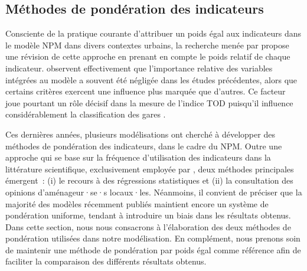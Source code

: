 \begin{refsegment}
\subsection{Méthodes de pondération des indicateurs
    \label{chap6:methodologie-ponderation-indicateurs}
    }

Consciente de la pratique courante d'attribuer un poids égal aux indicateurs dans le modèle \acrshort{NPM} dans divers contextes urbains, la recherche menée par \textcolor{blue}{\textcite[9]{liao_evaluating_2022}} propose une révision de cette approche en prenant en compte le poids relatif de chaque indicateur. \textcolor{blue}{\textcite[15]{monajem_evaluation_2015}} observent effectivement que l'importance relative des variables intégrées au modèle a souvent été négligée dans les études précédentes, alors que certains critères exercent une influence plus marquée que d'autres. Ce facteur joue pourtant un rôle décisif dans la mesure de l'indice \acrshort{TOD} puisqu'il influence considérablement la classification des gares \textcolor{blue}{\autocite[10]{lukman_development_2014}}.%

Ces dernières années, plusieurs modélisations ont cherché à développer des méthodes de pondération des indicateurs, dans le cadre du \acrshort{NPM}. Outre une approche qui se base sur la fréquence d'utilisation des indicateurs dans la littérature scientifique, exclusivement employée par \textcolor{blue}{\textcite[42]{lyu_developing_2016}}, deux méthodes principales émergent~: (i) le recours à des régressions statistiques et (ii) la consultation des opinions d'aménageur·se·s locaux·les. Néanmoins, il convient de préciser que la majorité des modèles récemment publiés maintient encore un système de pondération uniforme, tendant à introduire un biais dans les résultats obtenus. Dans cette section, nous nous consacrons à l'élaboration des deux méthodes de pondération utilisées dans notre modélisation. En complément, nous prenons soin de maintenir une méthode de pondération par poids égal comme référence afin de faciliter la comparaison des différents résultats obtenus.%


\end{refsegment}
